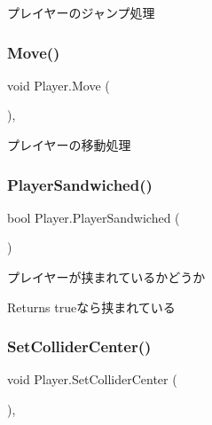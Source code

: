 プレイヤーのジャンプ処理 

\mbox{\label{class_player_a3fdebad803b97f4643696b3421be2195}} 
\subsubsection{\texorpdfstring{Move()}{Move()}}
{\footnotesize\ttfamily void Player.\+Move (\begin{DoxyParamCaption}{ }\end{DoxyParamCaption})\hspace{0.3cm}{\ttfamily [inline]}, {\ttfamily [private]}}



プレイヤーの移動処理 

\mbox{\label{class_player_a54be273b0cd99bf5f3ee8825bd8bc943}} 
\subsubsection{\texorpdfstring{Player\+Sandwiched()}{PlayerSandwiched()}}
{\footnotesize\ttfamily bool Player.\+Player\+Sandwiched (\begin{DoxyParamCaption}{ }\end{DoxyParamCaption})\hspace{0.3cm}{\ttfamily [inline]}}



プレイヤーが挟まれているかどうか 

\begin{DoxyReturn}{Returns}
trueなら挟まれている
\end{DoxyReturn}
\mbox{\label{class_player_a2a687463f122935a8b084231f0c919de}} 
\subsubsection{\texorpdfstring{Set\+Collider\+Center()}{SetColliderCenter()}}
{\footnotesize\ttfamily void Player.\+Set\+Collider\+Center (\begin{DoxyParamCaption}{ }\end{DoxyParamCaption})\hspace{0.3cm}{\ttfamily [inline]}, {\ttfamily [protected]}}



